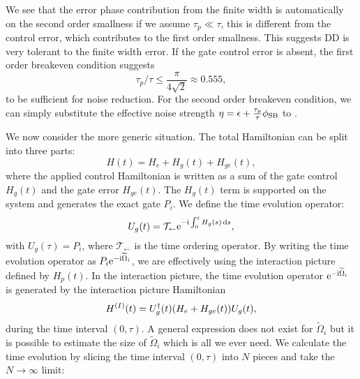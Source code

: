 \documentclass[b5paper,11pt]{article}
\newcommand{\wt}[1]{\widetilde{#1}}
\begin{document}
We see that the error phase contribution from the finite width is automatically on the second order smallness if we assume $\tau_p\ll \tau$, this is different from the control error, which contributes to the first order smallness. 
This suggests DD is very tolerant to the finite width error. If the gate control error is absent, the first order breakeven condition suggests
\begin{equation}
 \tau_p/\tau \le \frac{\pi}{4\sqrt{2}}\approx 0.555,
\end{equation}
to be sufficient for noise reduction.
For the second order breakeven condition, we can simply substitute the effective noise strength $\eta = \epsilon + \frac{\tau_p}{\tau}\phi_{\mathrm{SB}}$ to .


We now consider the more generic situation. The total Hamiltonian can be split into three parts:
\begin{equation}
 H(t)= H_e + H_g(t) + H_{ge}(t),
\end{equation}
where the applied control Hamiltonian is
written as a sum of the gate control $H_g(t)$ and the gate error $H_{ge}(t)$. The $H_g(t)$  term is supported on the system and generates the exact gate $P_i$. We define the time evolution operator:
\begin{equation}
U_g(t) = \mathcal{T}_\leftarrow \mathrm{e}^{-\mathrm{i} \int_{0}^{t} H_g(s) \mathop{}\!\mathrm{d} s},
\end{equation}
with $U_g(\tau)= P_i$, where $ \mathcal{T}_\leftarrow$ is the time ordering operator.
By writing the time evolution operator as $P_i \upe^{-\upi \wt \Omega_i}$, we are effectively using the interaction picture defined by $H_p(t)$. In the interaction picture,  the time evolution operator $\upe^{-\upi \wt \Omega_i}$  is generated by the interaction picture Hamiltonian 
\begin{equation}
H^{(I)}(t)=U_g^\dagger(t) (H_e + H_{ge} (t)) U_g(t),
\end{equation}
during the time interval $(0,\tau)$.
A general expression does not exist for $\wt \Omega_i$ but it is possible to estimate the size of $\wt \Omega_i$ which is all we ever need. 
We calculate the time evolution by slicing the time interval $(0,\tau)$ into $N$ pieces and take the $N\to\infty$ limit:
\end{document}
